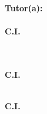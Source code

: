 \large
\begin{center}

    \begin{singlespace}
        \textbf{\MakeUppercase{\datosTitulo}} %
    \end{singlespace}

    \vfill

    \normalsize


    \begin{minipage}[t]{0.4\textwidth}
        \centering
        \textbf{Tutor(a):}\\
        \textbf{\MakeUppercase{\datosTutorTitulo \- \datosTutorNombre}}\\
        \textbf{C.I. \datosTutorCI}
    \end{minipage}
    \hfill
    \begin{minipage}[t]{0.4\textwidth}
        \centering
        \etiquetaAutor \\ %
        \textbf{\MakeUppercase{\datosAutoresTitulo \- \datosAutorNombre}}\\
        \textbf{C.I. \datosAutorCI}

        \ifdefined\datosSegAutorNombre
            \vspace{0.8cm} %
            \textbf{\MakeUppercase{\datosAutoresTitulo \- \datosSegAutorNombre}}\\
            \textbf{C.I. \datosSegAutorCI}
        \fi
    \end{minipage}

    \vfill

    \textbf{\MakeUppercase{\fechaPresentacion}} %
\end{center}
